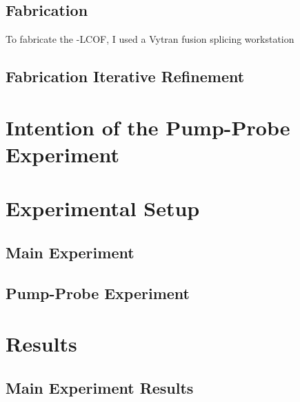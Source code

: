 \subsection{Fabrication}
\label{subsec:Cooling:Platform:Fabrication}

To fabricate the -\ac{LCOF}, I used a Vytran fusion splicing workstation


\subsection{Fabrication Iterative Refinement}
\label{subsec:Cooling:Platform:Refinement}


\section{Intention of the Pump-Probe Experiment}
\label{sec:Cooling:Intention}


\section{Experimental Setup}
\label{sec:Cooling:Setup}


\subsection{Main Experiment}
\label{subsec:Cooling:Setup:Main}


\subsection{Pump-Probe Experiment}
\label{subsec:Cooling:Setup:Pump-Probe}


\section{Results}
\label{sec:Cooling:Results}


\subsection{Main Experiment Results}
\label{subsec:Cooling:Results:Main}


